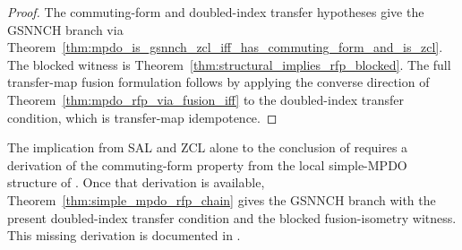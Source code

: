 \begin{proof}\leanok
    The commuting-form and doubled-index transfer hypotheses give the GSNNCH
    branch via
    Theorem~\ref{thm:mpdo_is_gsnnch_zcl_iff_has_commuting_form_and_is_zcl}.
    The blocked witness is Theorem~\ref{thm:structural_implies_rfp_blocked}. The
    full transfer-map fusion formulation follows by applying the converse direction
    of Theorem~\ref{thm:mpdo_rfp_via_fusion_iff} to the doubled-index transfer
    condition, which is transfer-map idempotence.
\end{proof}

\begin{remark}
    \label{rem:simple_mpdo_rfp_chain_gap}
    \notready
    The implication from SAL and ZCL alone to the conclusion of
    \cite[Appendix~C.2]{Cirac2016MPDO_arXiv} requires a derivation of the
    commuting-form property from the local simple-MPDO structure of
    \cite[Lemmas~C.2, C.4, and~C.5]{Cirac2016MPDO_arXiv}. Once that derivation
    is available,
    Theorem~\ref{thm:simple_mpdo_rfp_chain} gives the GSNNCH branch with the
    present doubled-index transfer condition and the blocked fusion-isometry
    witness. This missing derivation is documented
    in .
\end{remark}
